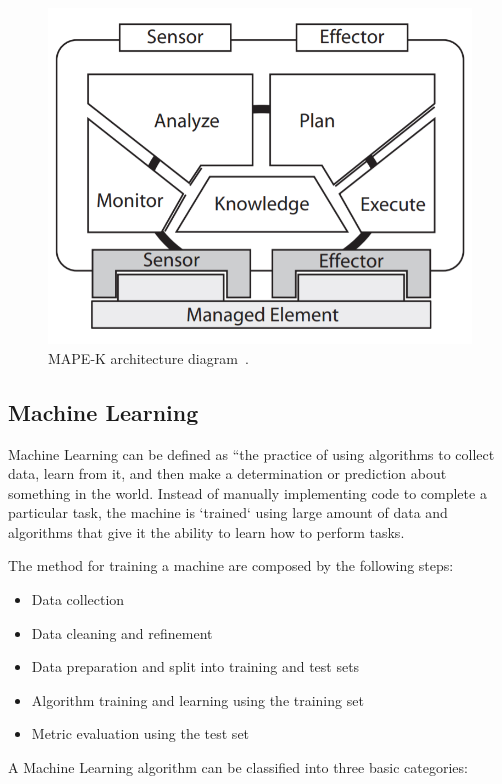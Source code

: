 \documentclass[10pt,conference]{IEEEtran}
\begin{document}
\begin{figure}[H]
\centering
\includegraphics[scale=0.5]{images/MAPE-K.png}
\caption {MAPE-K architecture diagram~\citep{Abbas_2010}.}
\label{fig:MAPEK}
\end{figure}

\subsection{Machine Learning}
Machine Learning can be defined as “the practice of using algorithms to collect data, learn from it, and then make a determination or prediction about something in the world. Instead of manually implementing code to complete a particular task, the machine is `trained` using large amount of data and algorithms that give it the ability to learn how to perform tasks.

The method for training a machine are composed by the following steps:

\begin{itemize}
\item Data collection
\item Data cleaning and refinement
\item Data preparation and split into training and test sets
\item Algorithm training and learning using the training set
\item Metric evaluation using the test set
\end{itemize}

A Machine Learning algorithm can be classified into three basic categories:
\end{document}
